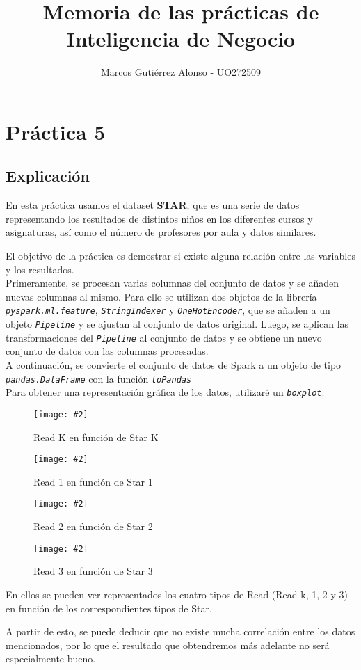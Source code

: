 \documentclass[
12pt, 
spanish, 
singlespacing,
headsepline
]{article}
\author{Marcos Gutiérrez Alonso - UO272509}
\title{Memoria de las prácticas de Inteligencia de Negocio}
\newcommand{\smallimage}[2]{
\begin{figure}[H]
	\caption{#1}
	\centering
	\texttt{[image: \#2]}
\end{figure}
}
\newcommand{\code}[1]{\textit{\texttt{#1}}}
\begin{document}
\begin{titlepage}
	\maketitle
	{\hypersetup{linkcolor=black}
	\tableofcontents
	}
\end{titlepage}
\section{Práctica 5}
\subsection{Explicación}
En esta práctica usamos el dataset \textbf{STAR}, que es una serie de datos representando los resultados de distintos niños en los diferentes cursos y asignaturas, así como el número de profesores por aula y datos similares.

El objetivo de la práctica es demostrar si existe alguna relación entre las variables y los resultados.
\\

Primeramente, se procesan varias columnas del conjunto de datos y se añaden nuevas columnas al mismo. Para ello se utilizan dos objetos de la librería \code{pyspark.ml.feature}, \code{StringIndexer} y \code{OneHotEncoder}, que se añaden a un objeto \code{Pipeline} y se ajustan al conjunto de datos original. Luego, se aplican las transformaciones del \code{Pipeline} al conjunto de datos y se obtiene un nuevo conjunto de datos con las columnas procesadas.
\\

A continuación, se convierte el conjunto de datos de Spark a un objeto de tipo \code{pandas.DataFrame} con la función \code{toPandas}
\\

Para obtener una representación gráfica de los datos, utilizaré un \code{boxplot}:
\smallimage{Read K en función de Star K}{PL5.1k.png}
\smallimage{Read 1 en función de Star 1}{PL5.1-1.png}
\smallimage{Read 2 en función de Star 2}{PL5.1-2.png}
\smallimage{Read 3 en función de Star 3}{PL5.1-3.png}
En ellos se pueden ver representados los cuatro tipos de Read (Read k, 1, 2 y 3) en función de los correspondientes tipos de Star.

A partir de esto, se puede deducir que no existe mucha correlación entre los datos mencionados, por lo que el resultado que obtendremos más adelante no será especialmente bueno.
\end{document}
